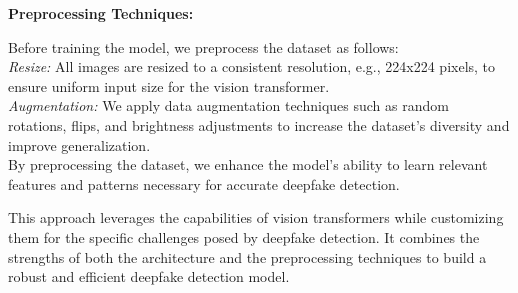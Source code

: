 \noindent \textbf{Preprocessing Techniques:}

\noindent Before training the model, we preprocess the dataset as follows:
\\

\noindent \textit{Resize:} All images are resized to a consistent resolution, e.g., 224x224 pixels, to ensure uniform input size for the vision transformer.
\\

\noindent \textit{Augmentation:} We apply data augmentation techniques such as random rotations, flips, and brightness adjustments to increase the dataset's diversity and improve generalization.
\\

\noindent By preprocessing the dataset, we enhance the model's ability to learn relevant features and patterns necessary for accurate deepfake detection.

\noindent This approach leverages the capabilities of vision transformers while customizing them for the specific challenges posed by deepfake detection. It combines the strengths of both the architecture and the preprocessing techniques to build a robust and efficient deepfake detection model.

